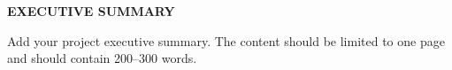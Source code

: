 \begin{center}
	\Large{\textbf{EXECUTIVE SUMMARY}}	
\end{center}
\vspace{1em}
\normalsize
\hspace{1cm} Add your project executive summary. The content should be limited to one page and should contain 200–300 words. 
